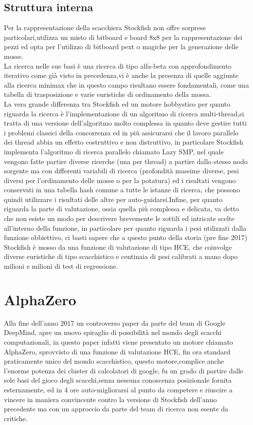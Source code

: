 \subsection{Struttura interna}
Per la rappresentazione della scacchiera Stockfish non offre sorprese particolari,utilizza un misto di bitboard e board 8x8 per la rappresentazione dei pezzi ed opta per l'utilizzo di bitboard pext
o magiche per la generazione delle mosse.\\La ricerca nelle sue basi è una ricerca di tipo alfa-beta con approfondimento iterativo come già visto in precedenza,vi è anche la presenza di quelle 
aggiunte alla ricerca minimax che in questo campo risultano essere fondamentali, come una tabella di trasposizione e varie euristiche di ordinamento della mossa.\\La vera grande differenza
tra Stockfish ed un motore hobbystico per quanto riguarda la ricerca è l'implementazione di un algoritmo di ricerca multi-thread,si tratta di una versione dell'algoritmo molto complessa in quanto deve
gestire tutti i problemi classici della concorrenza ed in più assicurarsi che il lavoro parallelo dei thread abbia un effetto costruttivo e non distruttivo, in particolare Stockfish implementa l'algoritmo di 
ricerca parallelo chiamato Lazy SMP, nel quale vengono fatte partire diverse ricerche (una per thread) a partire dallo stesso nodo sorgente ma con differenti variabili di ricerca (profondità massime diverse, pesi 
diversi per l'ordinamento delle mosse o per la potatura) ed i risultati vengono conservati in una tabella hash comune a tutte le istanze di ricerca, che possono quindi utilizzare i risultati delle altre per 
auto-guidarsi.Infine, per quanto riguarda la parte di valutazione, ossia quella più complessa e delicata, va detto che non esiste un modo per descrivere brevemente le sottili ed intricate scelte all'interno 
della funzione, in particolare per quanto riguarda i pesi utilizzati dalla funzione obbiettivo, ci basti sapere che a questo punto della storia (pre fine 2017) Stockfish è mosso da una funzione di valutazione 
di tipo HCE, che coinvolge diverse euristiche di tipo scacchistico e centinaia di pesi calibrati a mano dopo milioni e milioni di test di regressione.


\section{AlphaZero}
Alla fine dell'anno 2017 un controverso paper\cite{DBLP:journals/corr/abs-1712-01815} da parte del team di Google DeepMind, apre un nuovo spiraglio di possibilità nel mondo degli scacchi computazionali,
in questo paper infatti viene presentato un motore chiamato AlphaZero, sprovvisto di una funzione di valutazione HCE, fin ora standard praticamente unico del mondo scacchistico, questo motore,complice anche l'enorme 
potenza dei cluster di calcolatori di google, fu un grado di partire dalle sole basi del gioco degli scacchi,senza nessuna conoscenza posizionale fornita esternamente, ed in 4 ore auto-migliorarsi al punto 
da competere e riuscire a vincere in maniera convincente contro la versione di Stockfish dell'anno precedente ma con un approccio da parte del team di ricerca non esente da critiche\cite{chess.com}.



